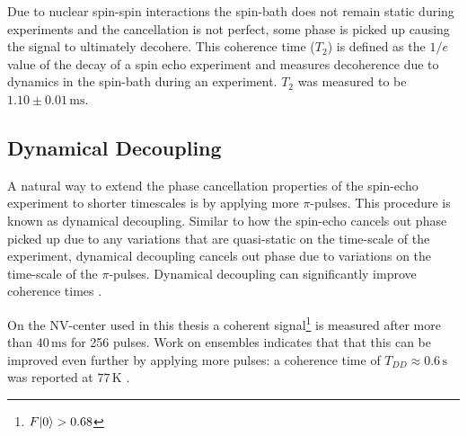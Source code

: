 Due to nuclear spin-spin interactions the spin-bath does not remain static during experiments and the cancellation is not perfect, some phase is picked up causing the signal to ultimately decohere.
This coherence time ($T_2$) is defined as the $1/e$ value of the decay of a spin echo experiment and measures decoherence due to dynamics in the spin-bath during an experiment.
$T_2$ was measured to be $1.10 \pm 0.01\, \mathrm{ms}$.

\subsection{Dynamical Decoupling}
A natural way to extend the phase cancellation properties of the spin-echo experiment to shorter timescales is by applying more $\pi$-pulses.
This procedure is known as dynamical decoupling.
Similar to how the spin-echo cancels out phase picked up due to any variations that are quasi-static on the time-scale of the experiment, dynamical decoupling cancels out phase due to variations on the time-scale of the $\pi$-pulses.
Dynamical decoupling can significantly improve coherence times \citep{Lange2010Universal}.

On the NV-center used in this thesis a coherent signal\footnote{$F{\left\vert{0}\right\rangle} > 0.68$} is measured after more than $40 \,\mathrm{ms}$ for 256 pulses.
Work on ensembles indicates that that this can be improved even further by applying more pulses: a coherence time of $T_{DD} \approx 0.6 \, \mathrm{s}$ was reported at $77\, \mathrm{K}$ \citep{Gill2013SolidState}.




